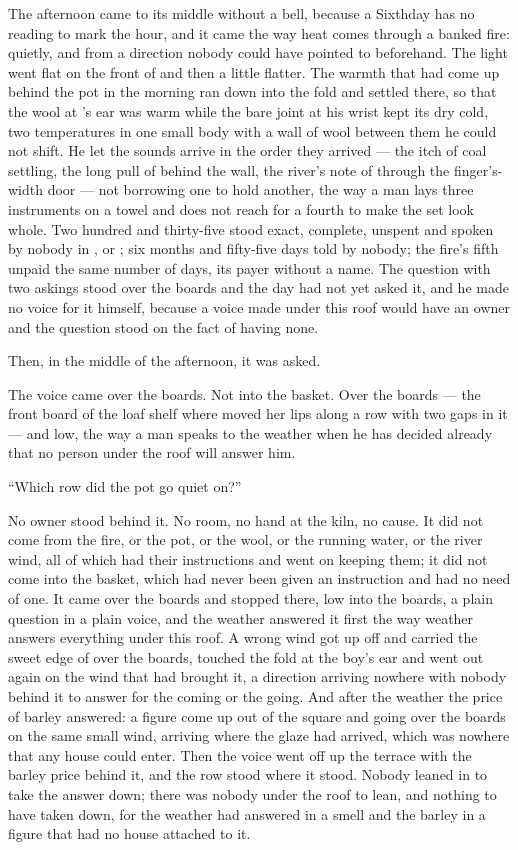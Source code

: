 The afternoon came to its middle without a bell, because a Sixthday has no reading to mark the hour, and it came the way heat comes through a banked fire: quietly, and from a direction nobody could have pointed to beforehand. The light went flat on the front of  and then a little flatter. The warmth that had come up behind the pot in the morning ran down into the fold and settled there, so that the wool at 's ear was warm while the bare joint at his wrist kept its dry cold, two temperatures in one small body with a wall of wool between them he could not shift. He let the sounds arrive in the order they arrived --- the itch of coal settling, the long pull of  behind the wall, the river's note of  through the finger's-width door --- not borrowing one to hold another, the way a man lays three instruments on a towel and does not reach for a fourth to make the set look whole. Two hundred and thirty-five stood exact, complete, unspent and spoken by nobody in ,  or ; six months and fifty-five days told by nobody; the fire's fifth unpaid the same number of days, its payer without a name. The question with two askings stood over the boards and the day had not yet asked it, and he made no voice for it himself, because a voice made under this roof would have an owner and the question stood on the fact of having none.

Then, in the middle of the afternoon, it was asked.

The voice came over the boards. Not into the basket. Over the boards --- the front board of the loaf shelf where  moved her lips along a row with two gaps in it --- and low, the way a man speaks to the weather when he has decided already that no person under the roof will answer him.

“Which row did the pot go quiet on?”

No owner stood behind it. No room, no hand at the kiln, no cause. It did not come from the fire, or the pot, or the wool, or the running water, or the river wind, all of which had their instructions and went on keeping them; it did not come into the basket, which had never been given an instruction and had no need of one. It came over the boards and stopped there, low into the boards, a plain question in a plain voice, and the weather answered it first the way weather answers everything under this roof. A wrong wind got up off  and carried the sweet edge of  over the boards, touched the fold at the boy's ear and went out again on the wind that had brought it, a direction arriving nowhere with nobody behind it to answer for the coming or the going. And after the weather the price of barley answered: a figure come up out of the square and going over the boards on the same small wind, arriving where the glaze had arrived, which was nowhere that any house could enter. Then the voice went off up the terrace with the barley price behind it, and the row stood where it stood. Nobody leaned in to take the answer down; there was nobody under the roof to lean, and nothing to have taken down, for the weather had answered in a smell and the barley in a figure that had no house attached to it.

